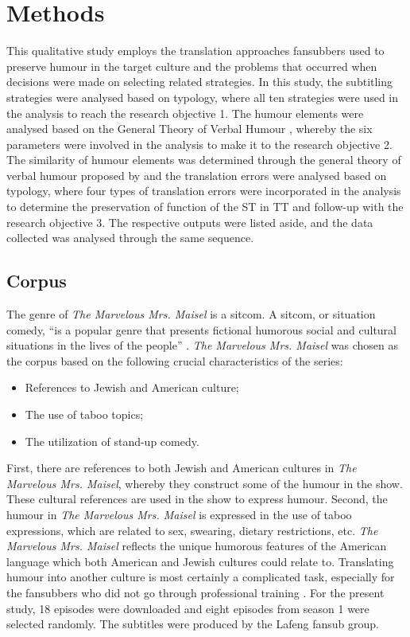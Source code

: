 \documentclass[english]{textolivre}
\begin{document}
\section{Methods}\label{sec-links}
This qualitative study employs the translation approaches fansubbers used to preserve humour in the target culture and the problems that occurred when decisions were made on selecting related strategies. In this study, the subtitling strategies were analysed based on \textcite{gottlieb_1992} typology, where all ten strategies were used in the analysis to reach the research objective 1. The humour elements were analysed based on the General Theory of Verbal Humour \cite{attardo_script_1991}, whereby the six parameters were involved in the analysis to make it to the research objective 2. The similarity of humour elements was determined through the general theory of verbal humour proposed by \cite{attardo_script_1991} and the translation errors were analysed based on \textcite{nord_translation_2001} typology, where four types of translation errors were incorporated in the analysis to determine the preservation of function of the ST in TT and follow-up with the research objective 3.  The respective outputs were listed aside, and the data collected was analysed through the same sequence.

\subsection{Corpus}\label{sec-outras-estr}
The genre of \textit{The Marvelous Mrs. Maisel} is a sitcom. A sitcom, or situation comedy, “is a popular genre that presents fictional humorous social and cultural situations in the lives of the people” \cite[p.~53]{alharthi_challenges_2016}. \textit{The Marvelous Mrs. Maisel} was chosen as the corpus based on the following crucial characteristics of the series:

\begin{itemize}
    \item References to Jewish and American culture;
    \item The use of taboo topics;
    \item The utilization of stand-up comedy.
\end{itemize}

First, there are references to both Jewish and American cultures in \textit{The Marvelous Mrs. Maisel}, whereby they construct some of the humour in the show. These cultural references are used in the show to express humour. Second, the humour in \textit{The Marvelous Mrs. Maisel} is expressed in the use of taboo expressions, which are related to sex, swearing, dietary restrictions, etc. \textit{The Marvelous Mrs. Maisel} reflects the unique humorous features of the American language which both American and Jewish cultures could relate to. Translating humour into another culture is most certainly a complicated task, especially for the fansubbers who did not go through professional training \cite{alharthi_challenges_2016}. For the present study, 18 episodes were downloaded and eight episodes from season 1 were selected randomly. The subtitles were produced by the Lafeng fansub group.
\end{document}
